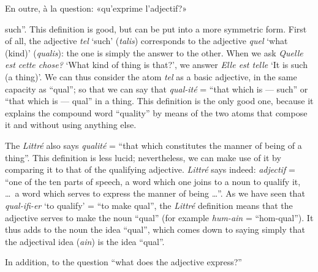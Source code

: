 \begin{sloppypar}
{  En outre, à la question: «qu’exprime l’adjectif?»

}
%
{\noindent
  such''. This definition is good, but can be put into a more
  symmetric form. First of all, the adjective \emph{tel} `such'
  (\emph{talis}) corresponds to the adjective \emph{quel} `what (kind)'
  (\emph{qualis}): the one is simply the answer to the other.  When we
  ask \emph{Quelle est cette chose?} `What kind of thing is that?', we
  answer \emph{Elle est telle} `It is such (a thing)'.  We can thus
  consider the atom \emph{tel} as a basic adjective, in the same capacity
  as ``qual''; so that we can say that \emph{qual-ité} = ``that which
  is --- such'' or ``that which is --- qual'' in a thing. This
  definition is the only good one, because it explains the compound
  word ``quality'' by means of the two atoms that compose it and
  without using anything else.

  The \textsl{Littré} also says \emph{qualité} = ``that which
  constitutes the manner of being of a thing''.  This definition is
  less lucid; nevertheless, we can make use of it by comparing it to
  that of the qualifying adjective. \textsl{Littré} says indeed:
  \emph{adjectif} = ``one of the ten parts of speech, a word which one
  joins to a noun to qualify it, \ldots\ a word which serves to
  express the manner of being \ldots''.  As we have seen that
  \emph{qual-ifi-er} `to qualify' = ``to make qual'', the
  \textsl{Littré} definition means that the adjective serves to make
  the noun ``qual'' (for example \emph{hum-ain} = ``hom-qual'').  It thus
  adds to the noun the idea ``qual'', which comes down to saying
  simply that the adjectival idea (\emph{ain}) is the idea ``qual''.

  In addition, to the question ``what does the adjective express?''

}


\end{sloppypar}
